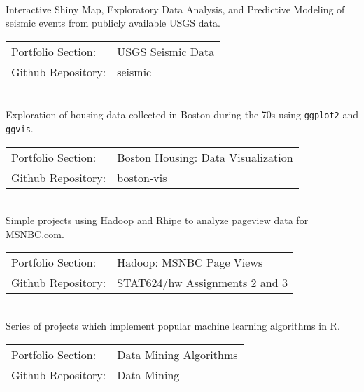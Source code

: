 \documentclass[letterpaper]{deedy-resume} %
\begin{document}
\begin{flushleft}
\\
Interactive Shiny Map, Exploratory Data Analysis, and
Predictive Modeling of seismic events from publicly available USGS
data.

\vspace{10pt}

\begin{tabular}{l  l}
  Portfolio Section: & USGS Seismic Data\\
  Github Repository: & seismic\\
\end{tabular}
\vspace{10pt}

\\
Exploration of housing data collected in Boston during the 70s using
\texttt{ggplot2} and \texttt{ggvis}.
\vspace{10pt}

\begin{tabular}{l  l}
  Portfolio Section: & Boston Housing: Data Visualization\\
  Github Repository: & boston-vis\\
\end{tabular}
\vspace{10pt}

\\
Simple projects using Hadoop and Rhipe to analyze pageview
data for MSNBC.com. 
\vspace{10pt}

\begin{tabular}{l  l}
  Portfolio Section: & Hadoop: MSNBC Page Views\\
  Github Repository: & STAT624/hw Assignments 2 and 3\\
\end{tabular}
\vspace{10pt}

\\
Series of projects which implement popular machine learning algorithms
in R.
\vspace{10pt}

\begin{tabular}{l  l}
  Portfolio Section: & Data Mining Algorithms\\
  Github Repository: & Data-Mining\\
\end{tabular}
\vspace{10pt}


\end{flushleft}
\end{document}
